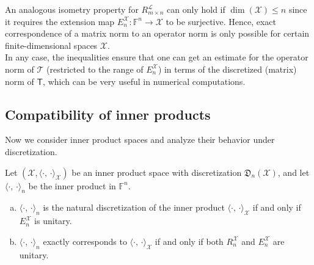 \documentclass[a4paper]{paper}
\newcommand{\Discr}{\mathfrak{D}}
\newcommand{\Spc}[1]{\mathscr{#1}}
\newcommand{\Field}{\mathbb{F}}
\newcommand{\Op}[1]{\mathcal{#1}}
\newcommand{\DiscOp}[1]{\mathsf{#1}}
\newcommand*{\EXT}[2]{\ensuremath{E_{#1}^{#2}}}
\newcommand*{\REST}[2]{\ensuremath{R_{#1}^{#2}}}
\newcommand*{\RnX}{\ensuremath{\REST{n}{\Spc{X}}}}
\newcommand*{\EnX}{\ensuremath{\EXT{n}{\Spc{X}}}}
\DeclareMathOperator{\DIM}{dim}
\newcommand*{\INNER}[2]{\ensuremath{\langle #1,\,#2\rangle}}
\begin{document}
\begin{remark}
 \label{remark:prop:norm:op_norm_corresp}
 An analogous isometry property for $\REST{m\times n}{\Spc{L}}$ can only hold if $\DIM(\Spc{X}) \leq n$ 
 since it requires the extension map $\EnX \colon \Field^n \to \Spc{X}$ to be surjective. Hence, exact correspondence 
 of a matrix norm to an operator norm is only possible for certain finite-dimensional spaces $\Spc{X}$.\\
 In any case, the inequalities ensure that one can get an estimate for the operator norm of $\Op{T}$ (restricted to the 
 range of $\EnX$) in terms of the discretized (matrix) norm of $\DiscOp{T}$, which can be very useful in numerical 
 computations.
\end{remark}



\subsection{Compatibility of inner products}
\label{subsec:prop:inner}

Now we consider inner product spaces and analyze their behavior under discretization.


\begin{lemma}
 \label{lemma:prop:inner:natural_corresp}
 Let $(\Spc{X}, \INNER{\cdot}{\cdot}_{\Spc{X}})$ be an inner product space with discretization $\Discr_n(\Spc{X})$, and 
 let $\INNER{\cdot}{\cdot}_n$ be the inner product in $\Field^n$.
 \begin{enumerate}[(a)]
  \item \label{lemma:prop:inner:natural_corresp:a_natural}
  $\INNER{\cdot}{\cdot}_n$ is the natural discretization of the inner product $\INNER{\cdot}{\cdot}_{\Spc{X}}$ if and 
  only if $\EnX$ is unitary.
  
  \item \label{lemma:prop:inner:natural_corresp:b_corresp}
  $\INNER{\cdot}{\cdot}_n$ exactly corresponds to $\INNER{\cdot}{\cdot}_{\Spc{X}}$ if and only if both $\RnX$ and 
  $\EnX$ are unitary.
 \end{enumerate}
\end{lemma}
\vspace{1em}
\end{document}
